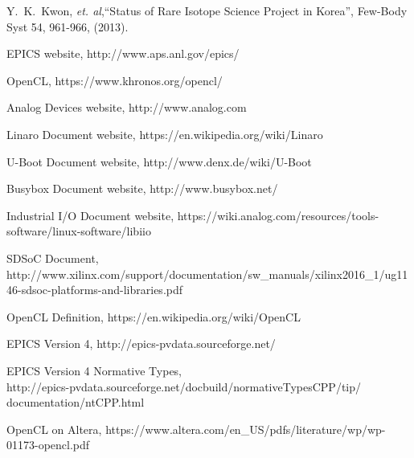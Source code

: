 \documentclass[journal]{IEEEtran}
\begin{document}

%
%
%
\begin{thebibliography}{3}

 Y.~K.~Kwon, {\it et. al},``Status of Rare Isotope Science Project in Korea'',
Few-Body Syst 54, 961-966, (2013).

EPICS website, http://www.aps.anl.gov/epics/

OpenCL, https://www.khronos.org/opencl/

Analog Devices website, http://www.analog.com

Linaro Document website, https://en.wikipedia.org/wiki/Linaro

U-Boot Document website, http://www.denx.de/wiki/U-Boot

Busybox Document website, http://www.busybox.net/


Industrial I/O Document website, https://wiki.analog.com/resources/tools-software/linux-software/libiio

SDSoC Document,\\ http://www.xilinx.com/support/documentation/sw\_manuals/xilinx2016\_1/ug1146-sdsoc-platforms-and-libraries.pdf

OpenCL Definition, https://en.wikipedia.org/wiki/OpenCL

EPICS Version 4, http://epics-pvdata.sourceforge.net/

EPICS Version 4 Normative Types,\\ http://epics-pvdata.sourceforge.net/docbuild/normativeTypesCPP/tip/\\documentation/ntCPP.html

OpenCL on Altera, https://www.altera.com/en\_US/pdfs/literature/wp/wp-01173-opencl.pdf

\end{thebibliography}

\end{document}
